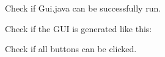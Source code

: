
\begin{DoxyEnumerate}
\item Check if Gui.\+java can be successfully run.
\item Check if the G\+UI is generated like this\+: 
\item Check if all buttons can be clicked. 
\end{DoxyEnumerate}